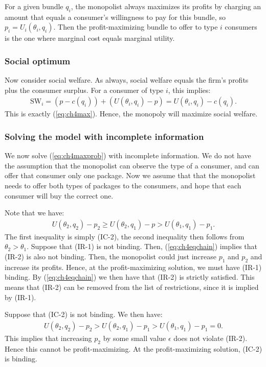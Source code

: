 For a given bundle $q_i$, the monopolist always maximizes its profits by
charging an amount that equals a consumer's willingness to pay for this bundle,
so $p_i=U_i(\theta_i,q_i)$. Then the profit-maximizing bundle to offer to type
$i$ consumers is the one where marginal cost equals marginal utility.
\subsubsection{Social optimum}
Now consider social welfare. As always, social welfare equals the firm's
profits plus the consumer surplus. For a consumer of type $i$, this implies:
\begin{align}
	\text{SW}_i=(p-c(q_i))+(U(\theta_i,q_i)-p)=U(\theta_i,q_i)-c(q_i).
\end{align}
This is exactly (\ref{eq:ch4max}). Hence, the monopoly will maximize social
welfare.
\subsubsection{Solving the model with incomplete information}
We now solve (\ref{eq:ch4maxprob}) with incomplete information. We do not have the assumption that the monopolist can observe the type of a
consumer, and can offer that consumer only one package. Now we assume that that the monopolist needs to offer both types of packages to the consumers,
and hope that each consumer will buy the correct one.

Note that we have:
\begin{align}
	U(\theta_2,q_2)-p_2\geq U(\theta_2,q_1)-p>U(\theta_1,q_1)-p_1.
	\label{eq:ch4eqchain}
\end{align}
The first inequality is simply (IC-2), the second inequality then follows from $\theta_2 > \theta_1$. Suppose that (IR-1) is not binding. Then,
(\ref{eq:ch4eqchain}) implies that (IR-2) is also not binding. Then, the monopolist could just increase $p_1$ and $p_2$ and increase its profits.
Hence, at the profit-maximizing solution, we must have (IR-1) binding. By (\ref{eq:ch4eqchain}) we then have that (IR-2) is strictly satisfied.
This means that (IR-2) can be removed from the list of restrictions, since it is implied by (IR-1).

Suppose that (IC-2) is not binding. We then have:
\begin{align}
	U(\theta_2,q_2)-p_2>U(\theta_2,q_1)-p_1>U(\theta_1,q_1)-p_1=0.
\end{align}
This implies that increasing $p_2$ by some small value $\epsilon$ does not violate (IR-2). Hence this cannot be profit-maximizing. At the
profit-maximizing solution, (IC-2) is binding.

